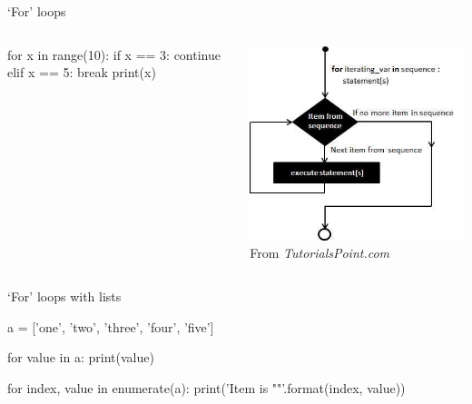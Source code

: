 \begin{frame}[fragile]{`For' loops}
    \begin{columns}
        \begin{column}{0.5\textwidth}
            \begin{py3}
                for x in range(10):
                    if x == 3:
                        continue
                    elif x == 5:
                        break
                    print(x)
            \end{py3}
        \end{column}
        \begin{column}{0.5\textwidth}
            \begin{center}
                \includegraphics[height=0.75\textheight]{figures/for_loop} \\
                {\scriptsize%
                 From \textit{TutorialsPoint.com}}
            \end{center}
        \end{column}
    \end{columns}
\end{frame}

\begin{frame}[fragile]{`For' loops with lists}
    \begin{py3}
        a = ['one', 'two', 'three', 'four', 'five']

        for value in a:
            print(value)

        for index, value in enumerate(a):
            print('Item {} is "{}"'.format(index, value))
    \end{py3}
\end{frame}

